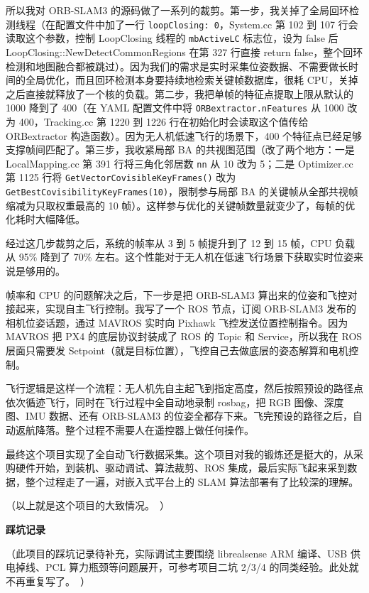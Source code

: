 \documentclass[11pt,a4paper]{article}
\begin{document}
所以我对 ORB-SLAM3 的源码做了一系列的裁剪。第一步，我关掉了全局回环检测线程（在配置文件中加了一行 \texttt{loopClosing: 0}，System.cc 第 102 到 107 行会读取这个参数，控制 LoopClosing 线程的 \texttt{mbActiveLC} 标志位，设为 false 后 LoopClosing::NewDetectCommonRegions 在第 327 行直接 return false，整个回环检测和地图融合都被跳过）。因为我们的需求是实时采集位姿数据、不需要做长时间的全局优化，而且回环检测本身要持续地检索关键帧数据库，很耗 CPU，关掉之后直接就释放了一个核的负载。第二步，我把单帧的特征点提取上限从默认的 1000 降到了 400（在 YAML 配置文件中将 \texttt{ORBextractor.nFeatures} 从 1000 改为 400，Tracking.cc 第 1220 到 1226 行在初始化时会读取这个值传给 ORBextractor 构造函数）。因为无人机低速飞行的场景下，400 个特征点已经足够支撑帧间匹配了。第三步，我收紧局部 BA 的共视图范围（改了两个地方：一是 LocalMapping.cc 第 391 行将三角化邻居数 \texttt{nn} 从 10 改为 5；二是 Optimizer.cc 第 1125 行将 \texttt{GetVectorCovisibleKeyFrames()} 改为 \texttt{GetBestCovisibilityKeyFrames(10)}，限制参与局部 BA 的关键帧从全部共视帧缩减为只取权重最高的 10 帧）。这样参与优化的关键帧数量就变少了，每帧的优化耗时大幅降低。

经过这几步裁剪之后，系统的帧率从 3 到 5 帧提升到了 12 到 15 帧，CPU 负载从 95\% 降到了 70\% 左右。这个性能对于无人机在低速飞行场景下获取实时位姿来说是够用的。

帧率和 CPU 的问题解决之后，下一步是把 ORB-SLAM3 算出来的位姿和飞控对接起来，实现自主飞行控制。我写了一个 ROS 节点，订阅 ORB-SLAM3 发布的相机位姿话题，通过 MAVROS 实时向 Pixhawk 飞控发送位置控制指令。因为 MAVROS 把 PX4 的底层协议封装成了 ROS 的 Topic 和 Service，所以我在 ROS 层面只需要发 Setpoint（就是目标位置），飞控自己去做底层的姿态解算和电机控制。

飞行逻辑是这样一个流程：无人机先自主起飞到指定高度，然后按照预设的路径点依次循迹飞行，同时在飞行过程中全自动地录制 rosbag，把 RGB 图像、深度图、IMU 数据、还有 ORB-SLAM3 的位姿全都存下来。飞完预设的路径之后，自动返航降落。整个过程不需要人在遥控器上做任何操作。

最终这个项目实现了全自动飞行数据采集。这个项目对我的锻炼还是挺大的，从采购硬件开始，到装机、驱动调试、算法裁剪、ROS 集成，最后实际飞起来采到数据，整个过程走了一遍，对嵌入式平台上的 SLAM 算法部署有了比较深的理解。

（以上就是这个项目的大致情况。\ ）

\vspace{1em}
\noindent\textbf{踩坑记录}

（此项目的踩坑记录待补充，实际调试主要围绕 librealsense ARM 编译、USB 供电掉线、PCL 算力瓶颈等问题展开，可参考项目二坑 2/3/4 的同类经验。此处就不再重复写了。\ ）
\end{document}
